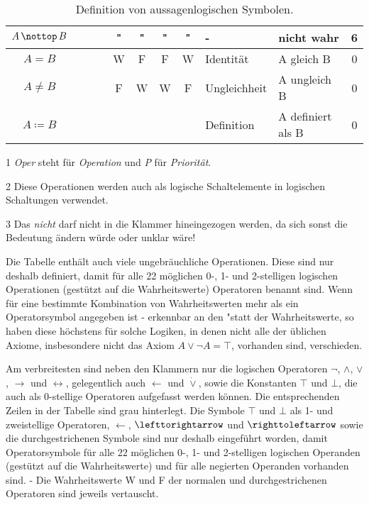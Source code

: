 \documentclass[english,ngerman,parskip=half,headsepline,footsepline]{scrreprt}
\newcommand{\ltrue}{\top}      %
\newcommand{\lfalse}{\bot}     %
\newcommand{\lleftimp}{\operatorname{\leftarrow}}      %
\newcommand{\lleft}{\operatorname{\righttoleftarrow}}  %
\newcommand{\limp}{\operatorname{\rightarrow}}         %
\newcommand{\lright}{\operatorname{\lefttorightarrow}} %
\newcommand{\lequiv}{\operatorname{\leftrightarrow}}   %
\newcommand{\lxor}{\operatorname{\dot{\lor}}}          %
\newcommand{\lnbtrue}{\operatorname{\nottop}    }      %
\newcommand{\defeq}{\coloneqq}
\begin{document}
\begin{table}
\begin{threeparttable}
\begin{tabularx}{\linewidth}{c||c:cc:cccc|X:X|c|}
			\tableline
			$A\lnbtrue B$&&&&"&"&"&"&-&nicht wahr&6\\
			\hline\hline %
			$A=B$&&&&W&F&F&W&Identität&A gleich B&0\\
			\tableline %
			$A\ne B$&&&&F&W&W&F&Ungleichheit&A ungleich B&0\\
			\tableline %
			$A\defeq B$&&&&&&&&Definition&A definiert als B&0\\
			\hline %
		\end{tabularx}
		\caption{Definition von aussagenlogischen Symbolen.}
		\label{tab:aussagenlogische Symbole}
		\begin{tablenotes}
			\item[1] \emph{Oper} steht für \emph{Operation} und \emph{P} für \emph{Priorität}.
			\item[2] Diese Operationen werden auch als logische Schaltelemente in logischen Schaltungen verwendet.
			\item[3] Das \emph{nicht} darf nicht in die Klammer hineingezogen werden, da sich sonst die Bedeutung ändern würde oder unklar wäre!
		\end{tablenotes}
	\end{threeparttable}\end{table}

	Die Tabelle enthält auch viele ungebräuchliche Operationen. Diese sind nur deshalb definiert, damit für alle 22 möglichen 0-, 1- und 2-stelligen logischen Operationen (gestützt auf die Wahrheitswerte) Operatoren benannt sind. Wenn für eine bestimmte Kombination von Wahrheitswerten mehr als ein Operatorsymbol angegeben ist - erkennbar an den \glq"\grq statt der Wahrheitswerte, so haben diese höchstens für solche Logiken, in denen nicht alle der üblichen Axiome, insbesondere nicht das Axiom $A\lor \lnot A = \ltrue$, vorhanden sind, verschieden.

	Am verbreitesten sind neben den Klammern nur die logischen Operatoren $\lnot$, $\land$, $\lor$, $\limp$ und $\lequiv$, gelegentlich auch $\lleftimp$ und $\lxor$, sowie die Konstanten $\ltrue$ und $\lfalse$, die auch als 0-stellige Operatoren aufgefasst werden können. Die entsprechenden Zeilen in der Tabelle sind grau hinterlegt. Die Symbole $\ltrue$ und $\lfalse$ als 1- und zweistellige Operatoren, $\lleftimp$, $\lright$ und $\lleft$ sowie die durchgestrichenen Symbole sind nur deshalb eingeführt worden, damit Operatorsymbole für alle 22 möglichen 0-, 1- und 2-stelligen logischen Operanden (gestützt auf die Wahrheitswerte) und für alle negierten Operanden vorhanden sind. - Die Wahrheitswerte W und F  der normalen und durchgestrichenen Operatoren sind jeweils vertauscht.
\end{document}
